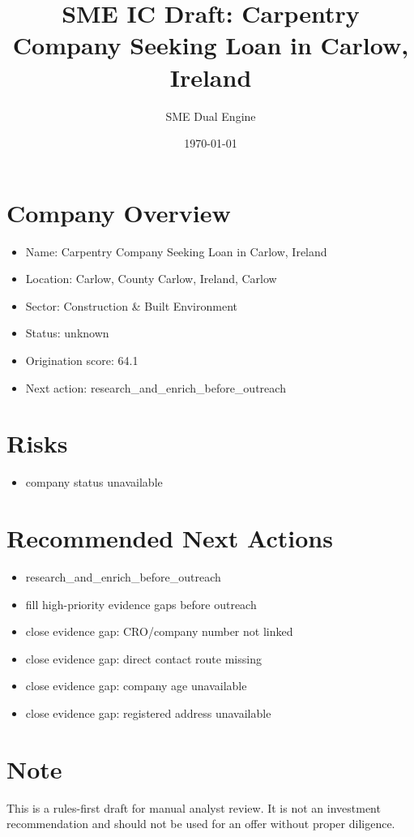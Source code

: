 \documentclass[11pt,a4paper]{article}
\title{SME IC Draft: Carpentry Company Seeking Loan in Carlow, Ireland}
\author{SME Dual Engine}
\date{\today}
\begin{document}
\maketitle
\section*{Company Overview}
\begin{itemize}[leftmargin=1.4em]
\item Name: Carpentry Company Seeking Loan in Carlow, Ireland
\item Location: Carlow, County Carlow, Ireland, Carlow
\item Sector: Construction \& Built Environment
\item Status: unknown
\item Origination score: 64.1
\item Next action: research\_and\_enrich\_before\_outreach
\end{itemize}
\section*{Risks}
\begin{itemize}[leftmargin=1.4em]
\item company status unavailable
\end{itemize}
\section*{Recommended Next Actions}
\begin{itemize}[leftmargin=1.4em]
\item research\_and\_enrich\_before\_outreach
\item fill high-priority evidence gaps before outreach
\item close evidence gap: CRO/company number not linked
\item close evidence gap: direct contact route missing
\item close evidence gap: company age unavailable
\item close evidence gap: registered address unavailable
\end{itemize}
\section*{Note}
This is a rules-first draft for manual analyst review. It is not an investment
recommendation and should not be used for an offer without proper diligence.
\end{document}
